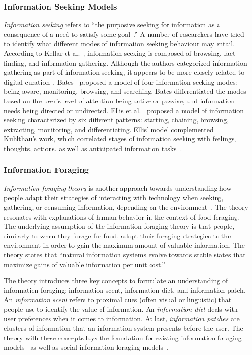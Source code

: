 \documentclass{sigchi}
\begin{document}
\subsubsection{Information Seeking Models}
\textit{Information seeking} refers to ``the purposive seeking for information as a consequence of a need to satisfy some goal~\cite{wilson2000human}.'' A number of researchers have tried to identify what different modes of information seeking behaviour may entail. According to Kellar et al.~\cite{kellar2006goal}, information seeking is composed of browsing, fact finding, and information gathering. Although the authors categorized information gathering as part of information seeking, it appears to be more closely related to digital curation~\cite{beagrie2008digital,whittaker2011personal}. Bates~\cite{bates1986exploratory,bates2002toward} proposed a model of four information seeking modes: being aware, monitoring, browsing, and searching. Bates differentiated the modes based on the user's level of attention being active or passive, and information needs being directed or undirected. Ellis et al.~\cite{ellis1989behavioural,ellis1993comparison,ellis1997modelling} proposed a model of information seeking characterized by six different patterns: starting, chaining, browsing, extracting, monitoring, and differentiating. Ellis' model complemented Kuhlthau's work, which correlated stages of information seeking with feelings, thoughts, actions, as well as anticipated information tasks~\cite{kuhlthau1991inside}. 

\subsubsection{Information Foraging}
\textit{Information foraging theory} is another approach towards understanding how people adapt their strategies of interacting with technology when seeking, gathering, or consuming information, depending on the environment~\cite{pirolli1999information}. The theory resonates with explanations of human behavior in the context of food foraging. The underlying assumption of the information foraging theory is that people, similarly to when they forage for food, adopt their foraging strategies to the environment in order to gain the maximum amount of valuable information. The theory states that ``natural information systems evolve towards stable states that maximize gains of valuable information per unit cost.''

The theory introduces three key concepts to formulate an understanding of information foraging: information scent, information diet, and information patch. An \textit{information scent} refers to proximal cues (often visual or linguistic) that people use to identify the value of information. An \textit{information diet} deals with user preferences when it comes to information. At last, \textit{information patches} are clusters of information that an information system presents before the user. The theory with these concepts lays the foundation for existing information foraging models~\cite{fu2007snif,kitajima2000comprehension} as well as social information foraging models~\cite{pirolli2009elementary,fu2008microstructures}.  
\end{document}
